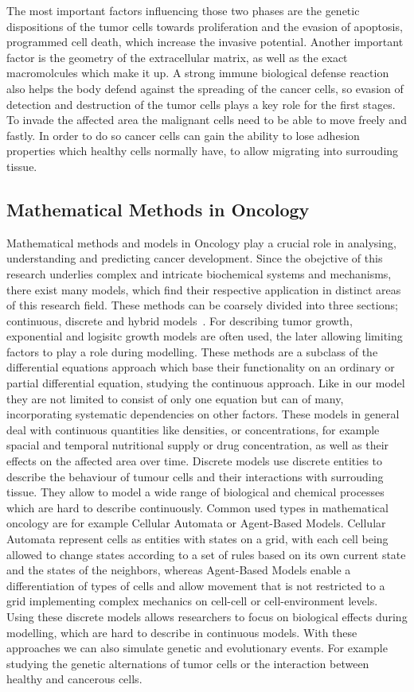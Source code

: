 The most important factors influencing those two phases are the genetic dispositions of the tumor cells towards proliferation and the evasion of apoptosis, programmed cell death, which increase the invasive potential. Another important factor is the geometry of the extracellular matrix, as well as the exact macromolcules which make it up. A strong immune biological defense reaction also helps the body defend against the spreading of the cancer cells, so evasion of detection and destruction of the tumor cells plays a key role for the first stages. To invade the affected area the malignant cells need to be able to move freely and fastly. In order to do so cancer cells can gain the ability to lose adhesion properties which healthy cells normally have, to allow migrating into surrouding tissue. 

\subsection{Mathematical Methods in Oncology}
Mathematical methods and models in Oncology play a crucial role in analysing, understanding and predicting cancer development. Since the obejctive of this research underlies complex and intricate biochemical systems and mechanisms, there exist many models, which find their respective application in distinct areas of this research field. These methods can be coarsely divided into three sections; continuous, discrete and hybrid models~\cite{BEKISZ2020101198}. For describing tumor growth, exponential and logisitc growth models are often used, the later allowing limiting factors to play a role during modelling. These methods are a subclass of the differential equations approach which base their functionality on an ordinary or partial differential equation, studying the continuous approach. Like in our model they are not limited to consist of only one equation but can of many, incorporating systematic dependencies on other factors. These models in general deal with continuous quantities like densities, or concentrations, for example spacial and temporal nutritional supply or drug concentration, as well as their effects on the affected area over time. Discrete models use discrete entities to describe the behaviour of tumour cells and their interactions with surrouding tissue. They allow to model a wide range of biological and chemical processes which are hard to describe continuously. Common used types in mathematical oncology are for example Cellular Automata or Agent-Based Models. Cellular Automata represent cells as entities with states on a grid, with each cell being allowed to change states according to a set of rules based on its own current state and the states of the neighbors, whereas Agent-Based Models enable a differentiation of types of cells and allow movement that is not restricted to a grid implementing complex mechanics on cell-cell or cell-environment levels. Using these discrete models allows researchers to focus on biological effects during modelling, which are hard to describe in continuous models. With these approaches we can also simulate genetic and evolutionary events. For example studying the genetic alternations of tumor cells or the interaction between healthy and cancerous cells.\newline 
